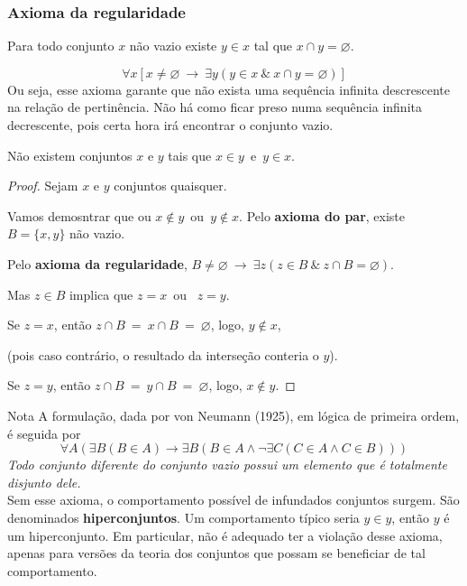 \subsubsection{Axioma da regularidade}
    \begin{stat}
        Para todo conjunto $x$ não vazio existe $y \in x$ tal que $x \cap y = \varnothing$.
    \end{stat}
        $$ \forall x [x \neq \varnothing\ \rightarrow\ \exists y (y \in x\ \&\ x \cap y = \varnothing)]$$
Ou seja, esse axioma garante que não exista uma sequência infinita descrescente na relação de pertinência. Não há como ficar preso numa sequência infinita decrescente, pois certa hora irá encontrar o conjunto vazio.
\newpage
\begin{theorem}
    Não existem conjuntos $x$ e $y$ tais que $x \in y$\ e\ $y \in x$.
\end{theorem}
\begin{proof}
    Sejam $x$ e $y$ conjuntos quaisquer.    
    
    Vamos demosntrar que ou $x \notin y$\ ou\ $y \notin x$. Pelo \textbf{axioma do par}, existe $B = \{x,y\}$ não vazio.
    
    Pelo \textbf{axioma da regularidade}, $B \neq \varnothing\ \rightarrow\ \exists z (z \in B\ \&\ z \cap B = \varnothing).$
    
    Mas $z \in B$ implica que $z = x$\ ou \ $z = y$.
    
    Se $z=x$, então $z \cap B\ =\ x \cap B\ =\ \varnothing$, logo, $y \notin x$,

    (pois caso contrário, o resultado da interseção conteria o $y$).

    Se $z=y$, então $z \cap B\ =\ y \cap B\ =\ \varnothing$, logo, $x \notin y$.
\end{proof}
\begin{mymdframed}{Nota}
A formulação, dada por von Neumann (1925), em lógica de primeira ordem, é seguida por
$$\forall A(\exists B(B\in A)\rightarrow \exists B(B\in A\land \neg \exists C(C\in A\land C\in B)))$$
\textit{Todo conjunto diferente do conjunto vazio possui um elemento que é totalmente disjunto dele.}\\
Sem esse axioma, o comportamento possível de infundados conjuntos surgem. São denominados \textbf{hiperconjuntos}. Um comportamento típico seria $y \in y$, então $y$ é um hiperconjunto. Em particular, não é adequado ter a violação desse axioma, apenas para versões da teoria dos conjuntos que possam se beneficiar de tal comportamento.
\end{mymdframed}